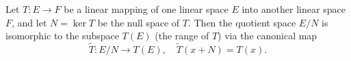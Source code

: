 Let $T : E \to F$ be a linear mapping of one linear space $E$ into another linear space $F$, and let $N = \ker T$ be the null space of $T$. Then the quotient space $E/N$ is isomorphic to the subspace $T(E)$ (the range of $T$) via the canonical map
$$
\tilde{T} : E/N \to T(E), \quad \tilde{T}(x + N) = T(x).
$$
